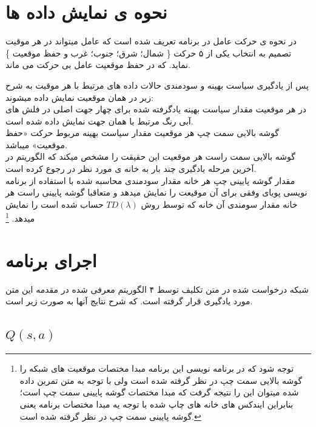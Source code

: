 \documentclass[10pt,a4paper]{article}
\begin{document}
\begin{Arabic}
\section{\textarabic{نحوه ی نمایش داده ها}}
در نحوه ی حرکت عامل در برنامه تعریف شده است که عامل میتواند در هر موقیت تصمیم به انتخاب یکی از ۵ حرکت
\{
 شمال؛ شرق؛ جنوب؛ غرب و حفظ موقعیت
\}
نماید. که در حفظ موقعیت عامل بی حرکت می ماند.
\par
پس از یادگیری سیاست بهینه و سودمندی حالات داده های مرتبط با هر موقیت به شرح زیر در همان موقعیت نمایش داده میشوند:\\
در هر موقعیت مقدار سیاست بهینه یادگرفته شده برای چهار جهت اصلی در فلش های آبی رنگ مرتبط با همان جهت نمایش داده شده است.\\
گوشه بالایی سمت چپ هر موقعیت مقدار سیاست بهینه مربوط حرکت «حفظ موقعیت» میباشد.\\
گوشه بالایی سمت راست هر موقعیت این حقیقت را مشخص میکند که الگوریتم در آخرین مرحله یادگیری چند بار به خانه ی مورد نظر در رجوع کرده است.\\
مقدار گوشه پایینی چپ هر خانه مقدار سودمندی محاسبه شده با استفاده از برنامه نویسی پویای وفقی برای آن موقیعت را نمایش میدهد و متعاقبا گوشه پایینی راست هر خانه مقدار سومندی آن خانه که توسط روش
\textenglish{$TD(\lambda)$}
حساب شده است را نمایش میدهد.
\footnote{\textarabic{توجه شود که در برنامه نویسی این برنامه مبدا مختصات موقعیت های شبکه را گوشه بالایی سمت چپ در نظر گرفته شده است ولی با توجه به متن تمرین داده شده میتوان این را نتیجه گرفت که مبدا مختصات گوشه پایینی سمت چپ است؛ بنابراین ایندکس های خانه های چاپ شده با توجه یه مبدا مختصات برنامه یعنی گوشه پایینی سمت چپ در نظر گرفته شده است.}}



\section{\textarabic{اجرای برنامه}}
شبکه درخواست شده در متن تکلیف توسط ۴ الگوریتم معرفی شده در مقدمه این متن مورد یادگیری قرار گرفته است. که شرح نتایج آنها به صورت زیر است.

\subsection{$Q(s, a)$}

\end{Arabic}
\end{document}
